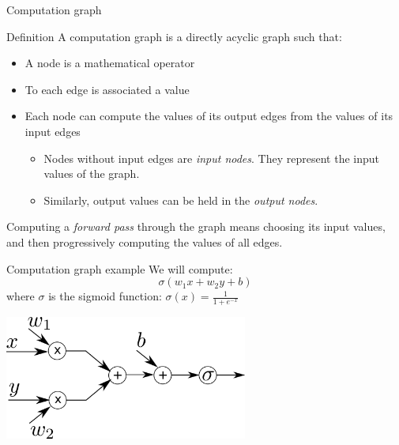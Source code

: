 \documentclass[xcolor=pdftex,dvipsnames,table,mathserif]{beamer}
\begin{document}
\begin{frame}{Computation graph}

\begin{block}{Definition}
  A computation graph is a directly acyclic graph such that:
  \begin{itemize}
  \item A node is a mathematical operator
  \item To each edge is associated a value
  \item Each node can compute the values of its output edges from the values of its input edges
    \begin{itemize}
    \item Nodes without input edges are \emph{input nodes}. They represent the input values of the graph.
    \item Similarly, output values can be held in the \emph{output nodes}.
    \end{itemize}
  \end{itemize}
\end{block}

Computing a \emph{forward pass} through the graph means choosing its input values, and then progressively computing the values of all edges.


\end{frame}


\begin{frame}{Computation graph example}
  We will compute:
  \[
  \sigma(w_1x + w_2y + b)
  \]
  where $\sigma$ is the sigmoid function: $\sigma(x) = \frac{1}{1 + e^{-x}}$

\vspace{3em}
\pause

  \centering
  \includegraphics[width=0.6\textwidth]{compu_graph}


\end{frame}
\end{document}
